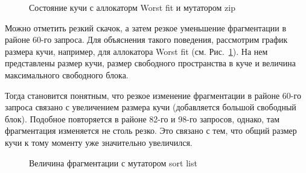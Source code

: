    \begin{figure}[p]
   \caption{Состояние кучи с аллокаторм Worst fit и мутатором zip}
   \label{ris:image2}
   \end{figure}
   
   Можно отметить резкий скачок, а затем резкое уменьшение фрагментации в районе 60-го запроса. Для объяснения такого поведения, 
рассмотрим график размера кучи,    например, для аллокатора Worst fit (см. Рис.~\ref{ris:image2}). На нем представлены размер кучи, 
размер свободного пространства в куче и величина максимального свободного блока.

   Тогда становится понятным, что резкое изменение фрагментации в районе 60-го запроса связано с увеличением размера кучи (добавляется 
большой свободный блок). Подобное повторяется в районе 82-го и 98-го запросов, однако, там фрагментация изменяется не столь резко. 
Это связано с тем, что общий размер кучи к тому моменту уже значительно увеличился.
      
   \begin{figure}[p]
   \caption{Величина фрагментации с мутатором sort list}
   \label{ris:image3}
   \end{figure}
   
